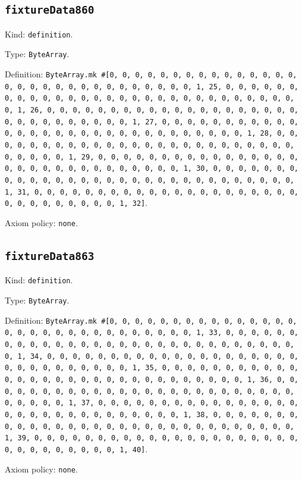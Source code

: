\documentclass[11pt]{article}
\begin{document}
\subsection*{\texttt{fixtureData860}}
\noindent Kind: \texttt{definition}.\par
\noindent Type: \texttt{ByteArray}.\par
\noindent Definition: \texttt{ByteArray.mk \#[0, 0, 0, 0, 0, 0, 0, 0, 0, 0, 0, 0, 0, 0, 0, 0, 0, 0, 0, 0, 0, 0, 0, 0, 0, 0, 0, 0, 0, 0, 1, 25, 0, 0, 0, 0, 0, 0, 0, 0, 0, 0, 0, 0, 0, 0, 0, 0, 0, 0, 0, 0, 0, 0, 0, 0, 0, 0, 0, 0, 0, 0, 1, 26, 0, 0, 0, 0, 0, 0, 0, 0, 0, 0, 0, 0, 0, 0, 0, 0, 0, 0, 0, 0, 0, 0, 0, 0, 0, 0, 0, 0, 0, 0, 1, 27, 0, 0, 0, 0, 0, 0, 0, 0, 0, 0, 0, 0, 0, 0, 0, 0, 0, 0, 0, 0, 0, 0, 0, 0, 0, 0, 0, 0, 0, 0, 1, 28, 0, 0, 0, 0, 0, 0, 0, 0, 0, 0, 0, 0, 0, 0, 0, 0, 0, 0, 0, 0, 0, 0, 0, 0, 0, 0, 0, 0, 0, 0, 1, 29, 0, 0, 0, 0, 0, 0, 0, 0, 0, 0, 0, 0, 0, 0, 0, 0, 0, 0, 0, 0, 0, 0, 0, 0, 0, 0, 0, 0, 0, 0, 1, 30, 0, 0, 0, 0, 0, 0, 0, 0, 0, 0, 0, 0, 0, 0, 0, 0, 0, 0, 0, 0, 0, 0, 0, 0, 0, 0, 0, 0, 0, 0, 1, 31, 0, 0, 0, 0, 0, 0, 0, 0, 0, 0, 0, 0, 0, 0, 0, 0, 0, 0, 0, 0, 0, 0, 0, 0, 0, 0, 0, 0, 0, 0, 1, 32]}.\par
\noindent Axiom policy: \texttt{none}.\par
\subsection*{\texttt{fixtureData863}}
\noindent Kind: \texttt{definition}.\par
\noindent Type: \texttt{ByteArray}.\par
\noindent Definition: \texttt{ByteArray.mk \#[0, 0, 0, 0, 0, 0, 0, 0, 0, 0, 0, 0, 0, 0, 0, 0, 0, 0, 0, 0, 0, 0, 0, 0, 0, 0, 0, 0, 0, 0, 1, 33, 0, 0, 0, 0, 0, 0, 0, 0, 0, 0, 0, 0, 0, 0, 0, 0, 0, 0, 0, 0, 0, 0, 0, 0, 0, 0, 0, 0, 0, 0, 1, 34, 0, 0, 0, 0, 0, 0, 0, 0, 0, 0, 0, 0, 0, 0, 0, 0, 0, 0, 0, 0, 0, 0, 0, 0, 0, 0, 0, 0, 0, 0, 1, 35, 0, 0, 0, 0, 0, 0, 0, 0, 0, 0, 0, 0, 0, 0, 0, 0, 0, 0, 0, 0, 0, 0, 0, 0, 0, 0, 0, 0, 0, 0, 1, 36, 0, 0, 0, 0, 0, 0, 0, 0, 0, 0, 0, 0, 0, 0, 0, 0, 0, 0, 0, 0, 0, 0, 0, 0, 0, 0, 0, 0, 0, 0, 1, 37, 0, 0, 0, 0, 0, 0, 0, 0, 0, 0, 0, 0, 0, 0, 0, 0, 0, 0, 0, 0, 0, 0, 0, 0, 0, 0, 0, 0, 0, 0, 1, 38, 0, 0, 0, 0, 0, 0, 0, 0, 0, 0, 0, 0, 0, 0, 0, 0, 0, 0, 0, 0, 0, 0, 0, 0, 0, 0, 0, 0, 0, 0, 1, 39, 0, 0, 0, 0, 0, 0, 0, 0, 0, 0, 0, 0, 0, 0, 0, 0, 0, 0, 0, 0, 0, 0, 0, 0, 0, 0, 0, 0, 0, 0, 1, 40]}.\par
\noindent Axiom policy: \texttt{none}.\par
\end{document}
